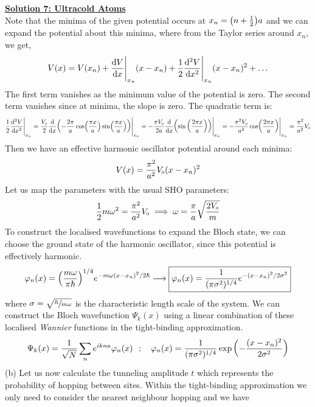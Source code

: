 \documentclass[usenames, svgnames, dvipsnames]{scrartcl}
\newcommand{\tund}[1]{_{\text{\tiny #1}}}
\begin{document}
    
\noindent
\underline{\textbf{{\sffamily Solution 7: Ultracold Atoms}}}
\\[0.4cm]
Note that the minima of the given potential occurs at $x_n = \qty(n+\frac{1}{2})a$ and we can expand the potential about this minima, where from the Taylor series around $x_n$, we get, 
$$V(x) = V(x_n) + \dv{V}{x}\Bigg|_{x_n}(x-x_n)+ \frac{1}{2}\dv[2]{V}{x}\Bigg|_{x_n} (x-x_n)^2+\ldots$$
The first term vanishes as the minimum value of the potential is zero. The second term vanishes since at minima, the slope is zero. The quadratic term is:
$$ \frac{1}{2}\dv[2]{V}{x}\Bigg|_{x_n}= \frac{V\tund{0}}{2}\dv{x}\qty(-\frac{2\pi}{a}\cos(\frac{\pi x}{a})\sin(\frac{\pi x}{a}))\Bigg|_{x_n} = -\frac{\pi V\tund{0}}{2a}\dv{x}\qty(\sin\qty(\frac{2\pi x}{a}))\Bigg|_{x_n} =-\frac{\pi^2 V\tund{0}}{a^2}\cos(\frac{2\pi x}{a})\Bigg|_{x_n}  = \frac{\pi^2 }{a^2}V\tund{0}$$
Then we have an effective harmonic oscillator potential around each minima:
$$V(x) =  \frac{\pi^2 }{a^2}V\tund{0} (x-x_n)^2$$
Let us map the parameters with the usual SHO parameters: 
$$\frac{1}{2}m\omega^2 =  \frac{\pi^2 }{a^2}V\tund{0} \implies  \omega = \frac{\pi}{a}\sqrt{\frac{2V\tund{0}}{m}}$$
To construct the localised wavefunctions to expand the Bloch state, we can choose the ground state of the harmonic oscillator, since this potential is effectively harmonic.  
$$\varphi_n(x) = \qty(\frac{m\omega}{\pi \hbar})^{1/4} e^{-m\omega(x-x_n)^2/2\hbar}\longrightarrow \boxed{\varphi_n(x) = \frac{1}{(\pi \sigma^2)^{1/4}} e^{-(x-x_n)^2/2\sigma^2}}$$
where $\sigma = \sqrt{\sfrac{\hbar}{m\omega}} $ is the characteristic length scale of the system.
We can construct the Bloch wavefunction $\Psi_k(x)$ using a linear combination of these localised \textit{Wannier} functions in the tight-binding approximation. 
$$\Psi_k(x) = \frac{1}{\sqrt{N}}\sum\limits_n e^{ikna}\varphi_n(x)\ \ ;\quad \varphi_n(x) = \frac{1}{(\pi \sigma^2)^{1/4}} \exp\qty(-\frac{(x-x_n)^2}{2\sigma^2})$$
(b) Let us now calculate the tunneling amplitude $t$ which represents the probability of hopping between sites. Within the tight-binding approximation we only need to consider the nearest neighbour hopping and we have 
\end{document}
